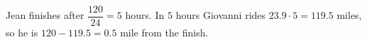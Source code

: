 Jean finishes after $\dfrac{120}{24}=5$ hours. In $5$ hours Giovanni rides $23.9\cdot5=119.5$ miles, so he is $120-119.5=\boxed{0.5}$ mile from the finish.
